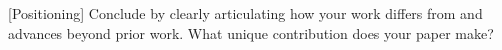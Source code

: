 [Positioning] Conclude by clearly articulating how your work differs from and advances beyond prior work. What unique contribution does your paper make?


